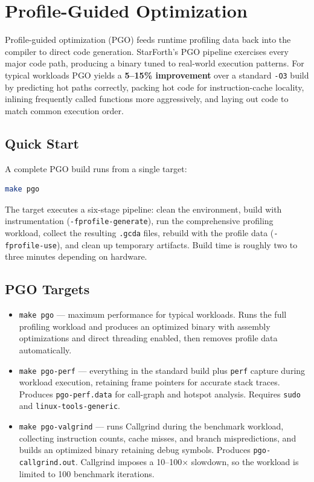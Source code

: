 
\section{Profile-Guided Optimization}

Profile-guided optimization (PGO) feeds runtime profiling data back into the
compiler to direct code generation. StarForth's PGO pipeline exercises every
major code path, producing a binary tuned to real-world execution patterns.
For typical workloads PGO yields a \textbf{5--15\% improvement} over a
standard \texttt{-O3} build by predicting hot paths correctly, packing hot
code for instruction-cache locality, inlining frequently called functions more
aggressively, and laying out code to match common execution order.

\subsection{Quick Start}

A complete PGO build runs from a single target:

\begin{lstlisting}[language=bash]
make pgo
\end{lstlisting}

The target executes a six-stage pipeline: clean the environment, build with
instrumentation (\texttt{-fprofile-generate}), run the comprehensive
profiling workload, collect the resulting \texttt{.gcda} files, rebuild with
the profile data (\texttt{-fprofile-use}), and clean up temporary artifacts.
Build time is roughly two to three minutes depending on hardware.

\subsection{PGO Targets}

\begin{itemize}
  \item \texttt{make pgo} --- maximum performance for typical workloads.
    Runs the full profiling workload and produces an optimized binary with
    assembly optimizations and direct threading enabled, then removes profile
    data automatically.
  \item \texttt{make pgo-perf} --- everything in the standard build plus
    \texttt{perf} capture during workload execution, retaining frame pointers
    for accurate stack traces. Produces \texttt{pgo-perf.data} for call-graph
    and hotspot analysis. Requires \texttt{sudo} and
    \texttt{linux-tools-generic}.
  \item \texttt{make pgo-valgrind} --- runs Callgrind during the benchmark
    workload, collecting instruction counts, cache misses, and branch
    mispredictions, and builds an optimized binary retaining debug symbols.
    Produces \texttt{pgo-callgrind.out}. Callgrind imposes a 10--100$\times$
    slowdown, so the workload is limited to 100 benchmark iterations.
\end{itemize}

